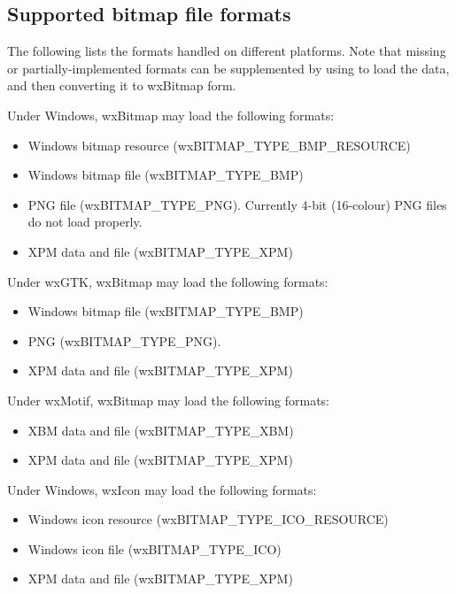 \subsection{Supported bitmap file formats}\label{supportedbitmapformats}

The following lists the formats handled on different platforms. Note
that missing or partially-implemented formats can be supplemented
by using  to load the data, and then converting
it to wxBitmap form.


Under Windows, wxBitmap may load the following formats:

\begin{itemize}\itemsep=0pt
\item Windows bitmap resource (wxBITMAP\_TYPE\_BMP\_RESOURCE)
\item Windows bitmap file (wxBITMAP\_TYPE\_BMP)
\item PNG file (wxBITMAP\_TYPE\_PNG). Currently 4-bit (16-colour) PNG files do not load properly.
\item XPM data and file (wxBITMAP\_TYPE\_XPM)
\end{itemize}

Under wxGTK, wxBitmap may load the following formats:

\begin{itemize}\itemsep=0pt
\item Windows bitmap file (wxBITMAP\_TYPE\_BMP)
\item PNG (wxBITMAP\_TYPE\_PNG).
\item XPM data and file (wxBITMAP\_TYPE\_XPM)
\end{itemize}

Under wxMotif, wxBitmap may load the following formats:

\begin{itemize}\itemsep=0pt
\item XBM data and file (wxBITMAP\_TYPE\_XBM)
\item XPM data and file (wxBITMAP\_TYPE\_XPM)
\end{itemize}


Under Windows, wxIcon may load the following formats:

\begin{itemize}\itemsep=0pt
\item Windows icon resource (wxBITMAP\_TYPE\_ICO\_RESOURCE)
\item Windows icon file (wxBITMAP\_TYPE\_ICO)
\item XPM data and file (wxBITMAP\_TYPE\_XPM)
\end{itemize}

